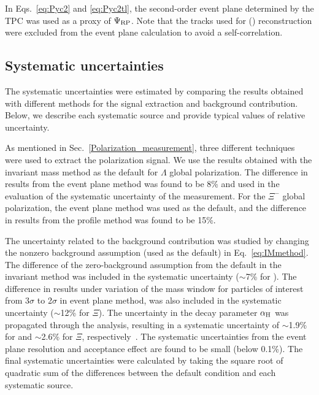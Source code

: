\documentclass[preprint,5p,times,twocolumn]{elsarticle}
\begin{document}
In Eqs.~\eqref{eq:Pyc2} and \eqref{eq:Pyc2tl}, the second-order event plane determined by the TPC was used as a proxy of $\Psi_{\rm RP}$. Note that the tracks used for \lam (\alam) reconstruction were excluded from the event plane calculation to avoid a self-correlation.

\subsection{Systematic uncertainties}
\label{syst}

The systematic uncertainties were estimated by comparing the results obtained with different methods for the signal extraction and background contribution. 
Below, we describe each systematic source and provide typical values of relative uncertainty.


As mentioned in Sec.~\ref{Polarization_measurement}, three different techniques were used to extract the polarization signal. 
We use the results obtained with the invariant mass method as the default for $\Lambda$ global polarization. 
The difference in results from the event plane method was found to be 8\% and used in the evaluation  of the systematic uncertainty of the measurement. 
For the $\Xi^{-}$ global polarization, the event plane method was used as the default, and the difference in results from the profile method was found to be 15\%.


The uncertainty related to the background contribution was studied by changing the nonzero background assumption (used as the default) in Eq.~\ref{eq:IMmethod}. 
The difference of the zero-background assumption from the default in the invariant method was included in the systematic uncertainty ($\sim$7\% for \lam).
The difference in results under variation of the mass window for particles of interest from 3$\sigma$ to 2$\sigma$ in event plane method, was also included in the systematic uncertainty ($\sim$12\% for $\Xi$).
%
The uncertainty in the decay parameter $\alpha_{\rm H}$ was propagated through the analysis, resulting in a systematic uncertainty of $\sim$1.9\% for \lam and $\sim$2.6\% for $\Xi$, respectively~\cite{ParticleDataGroup:2022pth}.
The systematic uncertainties from the event plane resolution and acceptance effect are found to be small (below 0.1\%). 
The final systematic uncertainties were calculated by taking the square root of quadratic sum of the differences between the default condition and each systematic source. 
\end{document}
